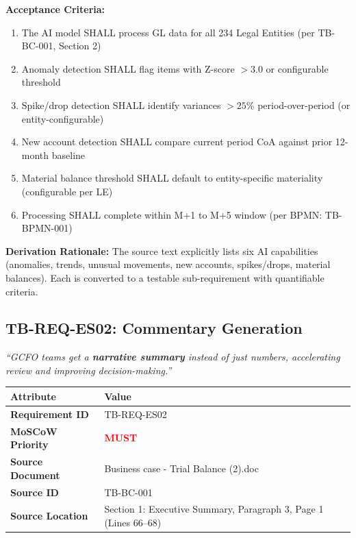 \documentclass[11pt,a4paper,twoside]{report}
\begin{document}
\vspace{0.5em}
\textbf{Acceptance Criteria:}

\begin{tcolorbox}[colback=sapamber!5,colframe=sapamber!70,title=Measurable Acceptance Criteria]
\begin{enumerate}[label=AC-ES01-\arabic*:,leftmargin=*]
\item The AI model SHALL process GL data for all 234 Legal Entities
(per TB-BC-001, Section 2)
\item Anomaly detection SHALL flag items with Z-score $> 3.0$ or configurable threshold
\item Spike/drop detection SHALL identify variances $> 25\%$ period-over-period
(or entity-configurable)
\item New account detection SHALL compare current period CoA against prior
12-month baseline
\item Material balance threshold SHALL default to entity-specific materiality
(configurable per LE)
\item Processing SHALL complete within M+1 to M+5 window (per BPMN: TB-BPMN-001)
\end{enumerate}
\end{tcolorbox}

\textbf{Derivation Rationale:} The source text explicitly lists six AI capabilities
(anomalies, trends, unusual movements, new accounts, spikes/drops, material balances).
Each is converted to a testable sub-requirement with quantifiable criteria.

\subsection{TB-REQ-ES02: Commentary Generation}
\label{req:tb-req-es02}

\begin{tcolorbox}[colback=sourcegreen!5,colframe=sourcegreen!70,title=Source Quotation]
\textit{``GCFO teams get a \textbf{narrative summary} instead of just numbers,
accelerating review and improving decision-making.''}
\end{tcolorbox}

\begin{tabularx}{\textwidth}{@{}lX@{}}
\toprule
\textbf{Attribute} & \textbf{Value} \\
\midrule
\textbf{Requirement ID} & TB-REQ-ES02 \\
\textbf{MoSCoW Priority} & \textcolor{red}{\textbf{MUST}} \\
\textbf{Source Document} & Business case - Trial Balance (2).doc \\
\textbf{Source ID} & TB-BC-001 \\
\textbf{Source Location} & Section 1: Executive Summary, Paragraph 3, Page 1 (Lines 66--68) \\
\bottomrule
\end{tabularx}
\end{document}
